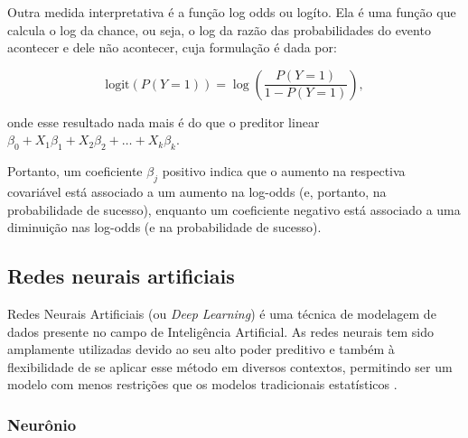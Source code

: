 Outra medida interpretativa é a função log odds ou logíto. Ela é uma função que calcula o log da chance, ou seja, o 
log da razão das probabilidades do evento acontecer e dele não acontecer, cuja formulação é dada por:

\begin{equation}
  \text{logit}(P(Y=1)) = \log \left( \frac{P(Y=1)}{1 - P(Y=1)} \right),
\end{equation}

\noindent onde esse resultado nada mais é do que o preditor linear $\beta_0 + X_{1}\beta_1 + X_{2}\beta_2 + \ldots +X_{k}\beta_k$. 

Portanto, um coeficiente $\beta_j$ positivo indica que o aumento na respectiva covariável está associado a um aumento na log-odds 
(e, portanto, na probabilidade de sucesso), enquanto um coeficiente negativo está associado a uma diminuição nas log-odds (e na probabilidade de
sucesso).


\subsection{Redes neurais artificiais}

Redes Neurais Artificiais (ou \textit{Deep Learning}) é uma técnica de modelagem de dados
 presente no campo de Inteligência Artificial. As redes neurais tem sido amplamente utilizadas devido ao seu alto
  poder preditivo e também à flexibilidade de se aplicar esse método em diversos contextos, permitindo
   ser um modelo com menos restrições que os modelos tradicionais estatísticos \cite{mitnews_neuralnetworks}.


\subsubsection{Neurônio}

